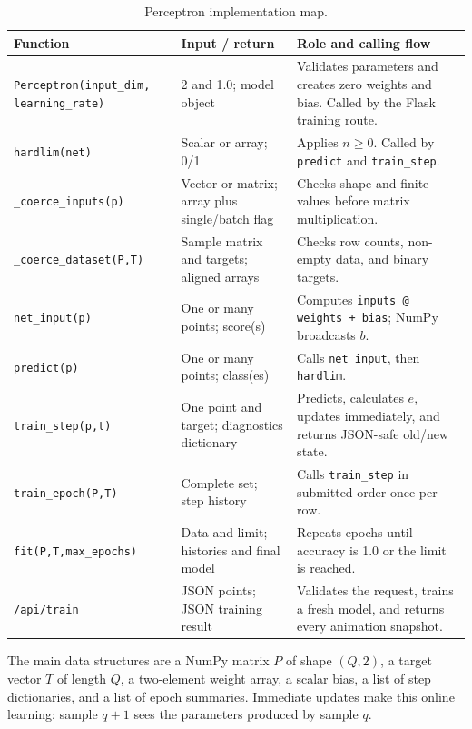 \documentclass[12pt,a4paper,openany]{report}
\begin{document}
\begin{table}[H]
\centering\footnotesize
\caption{Perceptron implementation map.}
\begin{tabularx}{\textwidth}{p{}p{}Y}
\toprule
\textbf{Function} & \textbf{Input / return} & \textbf{Role and calling flow} \\
\midrule
\texttt{Perceptron(input\_dim, learning\_rate)} & 2 and 1.0; model object & Validates parameters and creates zero weights and bias. Called by the Flask training route. \\
\texttt{hardlim(net)} & Scalar or array; 0/1 & Applies $n\ge0$. Called by \texttt{predict} and \texttt{train\_step}. \\
\texttt{\_coerce\_inputs(p)} & Vector or matrix; array plus single/batch flag & Checks shape and finite values before matrix multiplication. \\
\texttt{\_coerce\_dataset(P,T)} & Sample matrix and targets; aligned arrays & Checks row counts, non-empty data, and binary targets. \\
\texttt{net\_input(p)} & One or many points; score(s) & Computes \texttt{inputs @ weights + bias}; NumPy broadcasts $b$. \\
\texttt{predict(p)} & One or many points; class(es) & Calls \texttt{net\_input}, then \texttt{hardlim}. \\
\texttt{train\_step(p,t)} & One point and target; diagnostics dictionary & Predicts, calculates $e$, updates immediately, and returns JSON-safe old/new state. \\
\texttt{train\_epoch(P,T)} & Complete set; step history & Calls \texttt{train\_step} in submitted order once per row. \\
\texttt{fit(P,T,max\_epochs)} & Data and limit; histories and final model & Repeats epochs until accuracy is 1.0 or the limit is reached. \\
\texttt{/api/train} & JSON points; JSON training result & Validates the request, trains a fresh model, and returns every animation snapshot. \\
\bottomrule
\end{tabularx}
\end{table}

The main data structures are a NumPy matrix $P$ of shape $(Q,2)$, a target
vector $T$ of length $Q$, a two-element weight array, a scalar bias, a list of
step dictionaries, and a list of epoch summaries. Immediate updates make this
online learning: sample $q+1$ sees the parameters produced by sample $q$.
\end{document}
